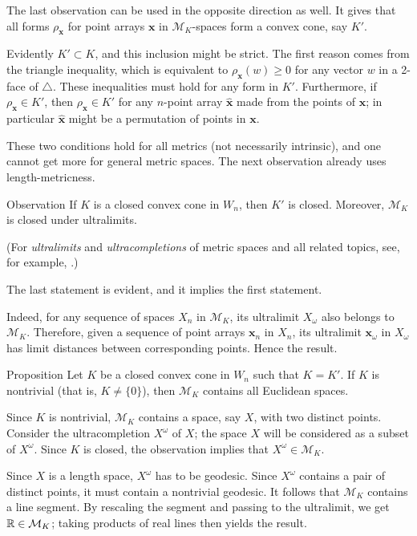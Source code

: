 \documentclass[a4paper,10pt]{article}
\begin{document}
The last observation can be used in the opposite direction as well.
It gives that all forms $\rho_{\bm{x}}$ for point arrays $\bm{x}$ in $\mathcal{M}_K$-spaces form a convex cone, say $K'$.

Evidently $K'\subset K$, and this inclusion might be strict.
The first reason comes from the triangle inequality, which is equivalent to $\rho_{\bm{x}}(w)\ge 0$ for any vector $w$ in a 2-face of $\triangle$.
These inequalities must hold for any form in $K'$.
Furthermore, if $\rho_{\bm{x}}\in K'$, then $\rho_{\hat{\bm{x}}}\in K'$ for any $n$-point array $\hat{\bm{x}}$ made from the points of $\bm{x}$; in particular $\hat{\bm{x}}$ might be a permutation of points in $\bm{x}$.

These two conditions hold for all metrics (not necessarily intrinsic),
and one cannot get more for general metric spaces.
The next observation already uses length-metricness.

\begin{thm}{Observation}
If $K$ is a closed convex cone in $W_n$, then $K'$ is closed.
Moreover, $\mathcal{M}_K$ is closed under ultralimits.
\end{thm}

(For \emph{ultralimits} and \emph{ultracompletions} of metric spaces and all related topics, see, for example, \cite{petrunin2023}.)

The last statement is evident, and it implies the first statement.

Indeed, for any sequence of spaces $X_n$ in $\mathcal{M}_K$, its ultralimit $X_\omega$ also belongs to $\mathcal{M}_K$.
Therefore, given a sequence of point arrays $\bm{x}_n$ in $X_n$,
its ultralimit $\bm{x}_\omega$ in $X_\omega$ has limit distances between corresponding points.
Hence the result.
\qeds

\begin{thm}{Proposition}\label{prop:Associated form}
Let $K$ be a closed convex cone in $W_n$ such that $K=K'$.
If $K$ is nontrivial (that is, $K\ne \{0\}$), then $\mathcal{M}_K$ contains all Euclidean spaces.
\end{thm}

Since $K$ is nontrivial, $\mathcal{M}_K$ contains a space, say $X$, with two distinct points.
Consider the ultracompletion $X^\omega$ of $X$;
the space $X$ will be considered as a subset of $X^\omega$.
Since $K$ is closed, the observation implies that $X^\omega\in \mathcal{M}_K$.

Since  $X$ is a length space, $X^\omega$ has to be geodesic.
Since $X^\omega$
contains a pair of distinct points, it must contain a nontrivial geodesic.
It follows that $\mathcal{M}_K$ contains a line segment.
By rescaling the segment and passing to the ultralimit, we get $\mathbb{R}\in \mathcal{M}_K$;
taking products of real lines then yields the result.
\qeds
\end{document}
